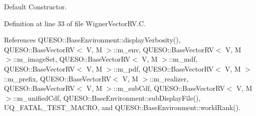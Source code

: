 Default Constructor. 



Definition at line 33 of file Wigner\-Vector\-R\-V.\-C.



References Q\-U\-E\-S\-O\-::\-Base\-Environment\-::display\-Verbosity(), Q\-U\-E\-S\-O\-::\-Base\-Vector\-R\-V$<$ V, M $>$\-::m\-\_\-env, Q\-U\-E\-S\-O\-::\-Base\-Vector\-R\-V$<$ V, M $>$\-::m\-\_\-image\-Set, Q\-U\-E\-S\-O\-::\-Base\-Vector\-R\-V$<$ V, M $>$\-::m\-\_\-mdf, Q\-U\-E\-S\-O\-::\-Base\-Vector\-R\-V$<$ V, M $>$\-::m\-\_\-pdf, Q\-U\-E\-S\-O\-::\-Base\-Vector\-R\-V$<$ V, M $>$\-::m\-\_\-prefix, Q\-U\-E\-S\-O\-::\-Base\-Vector\-R\-V$<$ V, M $>$\-::m\-\_\-realizer, Q\-U\-E\-S\-O\-::\-Base\-Vector\-R\-V$<$ V, M $>$\-::m\-\_\-sub\-Cdf, Q\-U\-E\-S\-O\-::\-Base\-Vector\-R\-V$<$ V, M $>$\-::m\-\_\-unified\-Cdf, Q\-U\-E\-S\-O\-::\-Base\-Environment\-::sub\-Display\-File(), U\-Q\-\_\-\-F\-A\-T\-A\-L\-\_\-\-T\-E\-S\-T\-\_\-\-M\-A\-C\-R\-O, and Q\-U\-E\-S\-O\-::\-Base\-Environment\-::world\-Rank().


